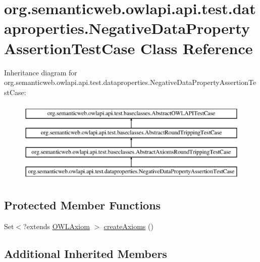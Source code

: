 \hypertarget{classorg_1_1semanticweb_1_1owlapi_1_1api_1_1test_1_1dataproperties_1_1_negative_data_property_assertion_test_case}{\section{org.\-semanticweb.\-owlapi.\-api.\-test.\-dataproperties.\-Negative\-Data\-Property\-Assertion\-Test\-Case Class Reference}
\label{classorg_1_1semanticweb_1_1owlapi_1_1api_1_1test_1_1dataproperties_1_1_negative_data_property_assertion_test_case}
}
Inheritance diagram for org.\-semanticweb.\-owlapi.\-api.\-test.\-dataproperties.\-Negative\-Data\-Property\-Assertion\-Test\-Case\-:\begin{figure}[H]
\begin{center}
\leavevmode
\includegraphics[height=4.000000cm]{classorg_1_1semanticweb_1_1owlapi_1_1api_1_1test_1_1dataproperties_1_1_negative_data_property_assertion_test_case}
\end{center}
\end{figure}
\subsection*{Protected Member Functions}
\begin{DoxyCompactItemize}
\item 
Set$<$?extends \hyperlink{interfaceorg_1_1semanticweb_1_1owlapi_1_1model_1_1_o_w_l_axiom}{O\-W\-L\-Axiom} $>$ \hyperlink{classorg_1_1semanticweb_1_1owlapi_1_1api_1_1test_1_1dataproperties_1_1_negative_data_property_assertion_test_case_aa1da3f4e0acf31bdd4445346482ae73c}{create\-Axioms} ()
\end{DoxyCompactItemize}
\subsection*{Additional Inherited Members}


